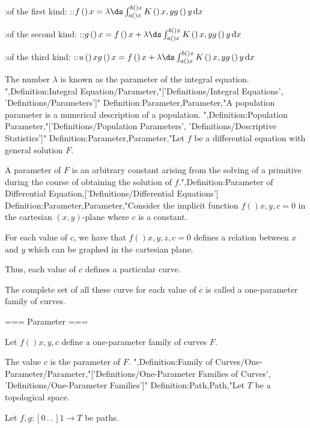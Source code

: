 :of the first kind:
::$f \left(   \right)x = \lambda \ds \int_{a \left(   \right)x}^{b \left(   \right)x} K \left(   \right){x, y} g \left(   \right)y \,\mathrm d x$

:of the second kind:
::$g \left(   \right)x = f \left(   \right)x + \lambda \ds \int_{a \left(   \right)x}^{b \left(   \right)x} K \left(   \right){x, y} g \left(   \right)y \,\mathrm d x$

:of the third kind:
::$u \left(   \right)x g \left(   \right)x = f \left(   \right)x + \lambda \ds \int_{a \left(   \right)x}^{b \left(   \right)x} K \left(   \right){x, y} g \left(   \right)y \,\mathrm d x$


The number $\lambda$ is known as the parameter of the integral equation.
",Definition:Integral Equation/Parameter,"['Definitions/Integral Equations', 'Definitions/Parameters']"
Definition:Parameter,Parameter,"A population parameter is a numerical description of a population.
",Definition:Population Parameter,"['Definitions/Population Parameters', 'Definitions/Descriptive Statistics']"
Definition:Parameter,Parameter,"Let $f$ be a differential equation with general solution $F$.

A parameter of $F$ is an arbitrary constant arising from the solving of a primitive during the course of obtaining the solution of $f$.",Definition:Parameter of Differential Equation,['Definitions/Differential Equations']
Definition:Parameter,Parameter,"Consider the implicit function $f \left(   \right){x, y, c} = 0$ in the cartesian $\left( x, y \right)$-plane where $c$ is a constant.


For each value of $c$, we have that $f \left(   \right){x, y, z, c} = 0$ defines a relation between $x$ and $y$ which can be graphed in the cartesian plane.

Thus, each value of $c$ defines a particular curve.


The complete set of all these curve for each value of $c$ is called a one-parameter family of curves.


=== Parameter ===

Let $f \left(   \right){x, y, c}$ define a one-parameter family of curves $F$.

The value $c$ is the parameter of $F$.
",Definition:Family of Curves/One-Parameter/Parameter,"['Definitions/One-Parameter Families of Curves', 'Definitions/One-Parameter Families']"
Definition:Path,Path,"Let $T$ be a topological space.

Let $f, g: \left[ 0 \,.\,.\,   \right]1 \to T$ be paths.


